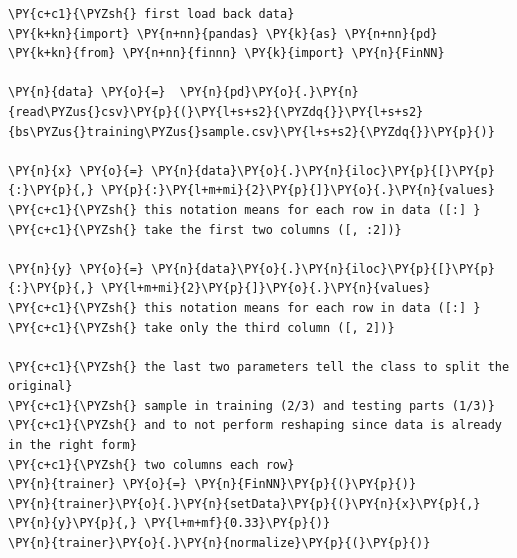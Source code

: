     \begin{tcolorbox}[breakable, size=fbox, boxrule=1pt, pad at break*=1mm,colback=cellbackground, colframe=cellborder]
\begin{Verbatim}[commandchars=\\\{\}]
\PY{c+c1}{\PYZsh{} first load back data}
\PY{k+kn}{import} \PY{n+nn}{pandas} \PY{k}{as} \PY{n+nn}{pd}
\PY{k+kn}{from} \PY{n+nn}{finnn} \PY{k}{import} \PY{n}{FinNN}

\PY{n}{data} \PY{o}{=}  \PY{n}{pd}\PY{o}{.}\PY{n}{read\PYZus{}csv}\PY{p}{(}\PY{l+s+s2}{\PYZdq{}}\PY{l+s+s2}{bs\PYZus{}training\PYZus{}sample.csv}\PY{l+s+s2}{\PYZdq{}}\PY{p}{)}

\PY{n}{x} \PY{o}{=} \PY{n}{data}\PY{o}{.}\PY{n}{iloc}\PY{p}{[}\PY{p}{:}\PY{p}{,} \PY{p}{:}\PY{l+m+mi}{2}\PY{p}{]}\PY{o}{.}\PY{n}{values}
\PY{c+c1}{\PYZsh{} this notation means for each row in data ([:] }
\PY{c+c1}{\PYZsh{} take the first two columns ([, :2])}

\PY{n}{y} \PY{o}{=} \PY{n}{data}\PY{o}{.}\PY{n}{iloc}\PY{p}{[}\PY{p}{:}\PY{p}{,} \PY{l+m+mi}{2}\PY{p}{]}\PY{o}{.}\PY{n}{values}
\PY{c+c1}{\PYZsh{} this notation means for each row in data ([:] }
\PY{c+c1}{\PYZsh{} take only the third column ([, 2])}

\PY{c+c1}{\PYZsh{} the last two parameters tell the class to split the original}
\PY{c+c1}{\PYZsh{} sample in training (2/3) and testing parts (1/3)}
\PY{c+c1}{\PYZsh{} and to not perform reshaping since data is already in the right form}
\PY{c+c1}{\PYZsh{} two columns each row}
\PY{n}{trainer} \PY{o}{=} \PY{n}{FinNN}\PY{p}{(}\PY{p}{)}
\PY{n}{trainer}\PY{o}{.}\PY{n}{setData}\PY{p}{(}\PY{n}{x}\PY{p}{,} \PY{n}{y}\PY{p}{,} \PY{l+m+mf}{0.33}\PY{p}{)}
\PY{n}{trainer}\PY{o}{.}\PY{n}{normalize}\PY{p}{(}\PY{p}{)}
\end{Verbatim}
\end{tcolorbox}

